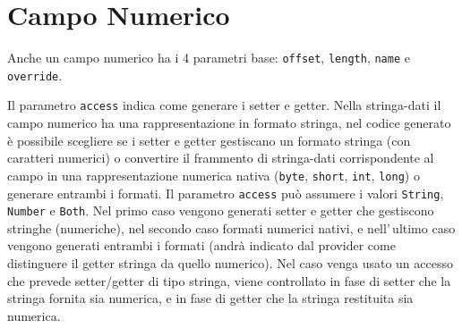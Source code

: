 \documentclass[a4paper,10pt]{report}
\begin{document}
\section{Campo Numerico}
Anche un campo numerico ha i 4 parametri base: \verb!offset!, \verb!length!,
\verb!name! e \verb!override!.

Il parametro \verb!access! indica come generare i setter e getter.
Nella stringa-dati il campo numerico ha una rappresentazione in formato stringa,
nel codice generato è possibile scegliere se i setter e getter gestiscano un
formato stringa (con caratteri numerici) o convertire il frammento di 
stringa-dati corrispondente al campo in una rappresentazione numerica nativa 
(\verb!byte!, \verb!short!, \verb!int!, \verb!!\verb!long!) o generare entrambi 
i formati.
Il parametro \verb!access! può assumere i valori \verb!String!, \verb!Number! e 
\verb!Both!. Nel primo caso vengono generati setter e getter che gestiscono
stringhe (numeriche), nel secondo caso formati numerici nativi, e nell'\,ultimo
caso vengono generati entrambi i formati (andrà indicato dal provider come
distinguere il getter stringa da quello numerico).
Nel caso venga usato un accesso che prevede setter/getter di tipo stringa,
viene controllato in fase di setter che la stringa fornita sia numerica,
e in fase di getter che la stringa restituita sia numerica.
\end{document}
